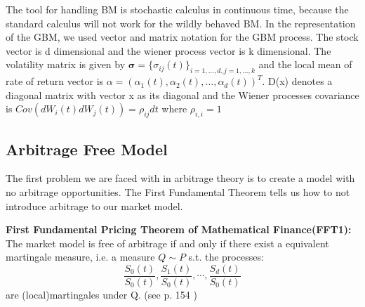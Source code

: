 The tool for handling BM is stochastic calculus in continuous time, because the standard calculus will not work for the wildly behaved BM. In the representation of the GBM, we used vector and matrix notation for the GBM process. The stock vector is d dimensional and the wiener process vector is k dimensional. The volatility matrix is given by $\bm{\sigma}=\{\sigma_{ij}(t)\}_{i=1,\ldots,d,j=1,\ldots,k}$ and the local mean of rate of return vector is $\alpha=(\alpha_1(t), \alpha_2(t), \ldots, \alpha_d(t))^T$. D(x) denotes a diagonal matrix with vector x as its diagonal and the Wiener processes covariance is $Cov(dW_i(t)dW_j(t))=\rho_{ij}dt$ where $\rho_{i,i}=1$

\subsection{Arbitrage Free Model}
The first problem we are faced with in arbitrage theory is to create a model with no arbitrage opportunities. The First Fundamental Theorem tells us how to not introduce arbitrage to our market model.
\begin{theorem}\label{FFT1}
\textbf{First Fundamental Pricing Theorem of Mathematical Finance(FFT1): } The market model is free of arbitrage if and only if there exist a equivalent martingale measure, i.e. a measure $Q\sim P$ s.t. the processes:
$$\frac{S_0(t)}{S_0(t)}, \frac{S_1(t)}{S_0(t)}, \cdots, \frac{S_d(t)}{S_0(t)}$$
are (local)martingales under Q.
(see p. 154 \parencite{finKont})
\end{theorem}

